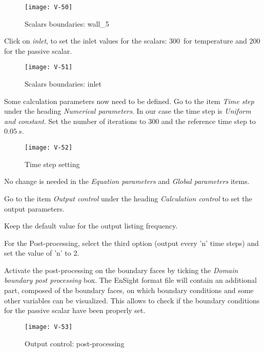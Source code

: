 \begin{figure}[h!]
\begin{center}
\texttt{[image: V-50]}
\caption{Scalars boundaries: wall\_5}
\label{fig21_e2}
\end{center}
\end{figure}


\newpage
Click on {\itshape inlet}, to set the inlet values for the scalars: 300\degresC\
for temperature and 200 for the passive scalar.

\begin{figure}[h!]
\begin{center}
\texttt{[image: V-51]}
\caption{Scalars boundaries: inlet}
\label{fig22_e2}
\end{center}
\end{figure}


\newpage
Some calculation parameters now need to be defined.
Go to the item {\itshape Time step} under the heading
{\itshape Numerical parameters}. In our case the time step is
{\itshape Uniform and constant}. Set the number of iterations to 300 and the
reference time step to $0.05\ s$.

\begin{figure}[h!]
\begin{center}
\texttt{[image: V-52]}
\caption{Time step setting}
\label{fig23_e2}
\end{center}
\end{figure}

No change is needed in the {\itshape Equation parameters} and {\itshape Global parameters} items.

\newpage
Go to the item {\itshape Output control} under the heading {\itshape Calculation control} to set the output parameters.

Keep the default value for the output listing frequency.

For the Post-processing, select the third option (output every 'n' time steps)
and set the value of 'n' to 2.

Activate the post-processing on the boundary faces by ticking the
{\itshape Domain boundary post processing} box. The EnSight format file will
contain an additional part, composed of the boundary faces, on which boundary
conditions and some other variables can be visualized. This allows to check if
the boundary conditions for the passive scalar have been properly set.

\begin{figure}[h!]
\begin{center}
\texttt{[image: V-53]}
\caption{Output control: post-processing}
\label{fig24_e2}
\end{center}
\end{figure}


